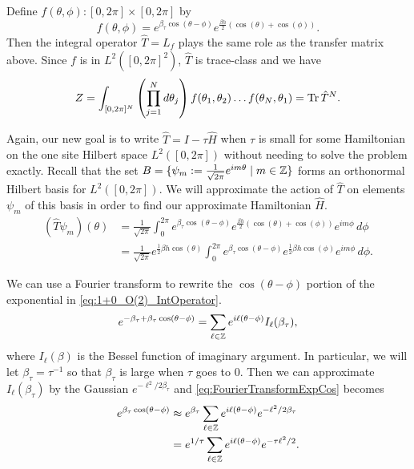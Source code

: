 \documentclass[10pt,reqno]{amsart}
\begin{document}
	Define $f(\theta,\phi): [0,2\pi]\times [0,2\pi]$ by 
	\[f(\theta,\phi)=e^{\beta_\tau \cos(\theta -\phi)}e^{\frac{\beta h}{2}(\cos(\theta)+\cos(\phi))}. \]
	Then the integral operator $\hat{T}=L_f$ plays the same role as the transfer matrix above.
	Since $f$ is in $L^2([0,2\pi]^2)$, $\hat{T}$ is trace-class and we have
	\[Z= \int_{[0,2\pi]^N} \left(\prod_{j=1}^N d\theta_j \right) f(\theta_1,\theta_2)\ldots f(\theta_N,\theta_1) = \Tr \hat{T}^N. \]
	
	Again, our new goal is to write $\hat{T}=I-\tau\hat{H}$ when $\tau$ is small for some Hamiltonian on the one site Hilbert space $L^2([0,2\pi])$ without needing to solve the problem exactly. 
	Recall that the set $B=\{\psi_m:=\frac{1}{\sqrt{2\pi}} e^{im\theta} \mid m \in \mathbb{Z} \}$ forms an orthonormal Hilbert basis for $L^2([0,2\pi])$.
	We will approximate the action of $\hat{T}$ on elements $\psi_m$ of this basis in order to find our approximate Hamiltonian $\hat{H}$.
	\begin{align}
		(\hat{T}\psi_m)(\theta) &= \frac{1}{\sqrt{2\pi}}\int_{0}^{2\pi} e^{\beta_\tau \cos(\theta -\phi)}e^{\frac{\beta h}{2}(\cos(\theta)+\cos(\phi))} e^{im\phi}\, d\phi \nonumber \\
		&=\frac{1}{\sqrt{2\pi}}e^{\frac{1}{2}\beta h \cos(\theta)} \int_{0}^{2\pi} e^{\beta_\tau \cos(\theta -\phi)}e^{\frac{1}{2}\beta h \cos(\phi)}e^{im\phi}\, d\phi. \label{eq:1+0_O(2)_IntOperator}
	\end{align}
	
	We can use a Fourier transform to rewrite the $\cos(\theta-\phi)$ portion of the exponential in \cref{eq:1+0_O(2)_IntOperator}.
	\begin{equation}\label{eq:FourierTransformExpCos}
		e^{-\beta_\tau+\beta_\tau\cos(\theta-\phi)}=\sum_{\ell\in \mathbb{Z}}e^{i\ell(\theta-\phi)}I_\ell(\beta_\tau),
	\end{equation}
	where $I_\ell(\beta)$ is the Bessel function of imaginary argument.
	In particular, we will let $\beta_\tau=\tau^{-1}$ so that $\beta_\tau$ is large when $\tau$ goes to 0. 
	Then we can approximate $I_\ell(\beta_\tau)$ by the Gaussian $e^{-\ell^2/2\beta_\tau}$ and \cref{eq:FourierTransformExpCos} becomes
	\begin{align}
		e^{\beta_\tau\cos(\theta-\phi)}&\approx e^{\beta_\tau}\sum_{\ell\in \mathbb{Z}}e^{i\ell(\theta-\phi)}e^{-\ell^2/2\beta_\tau}\\
			&=e^{1/\tau}\sum_{\ell\in \mathbb{Z}}e^{i\ell(\theta-\phi)}e^{-\tau\ell^2/2}. \label{eq:FourierTransformExpCosApprox}
	\end{align}
	
\end{document}
